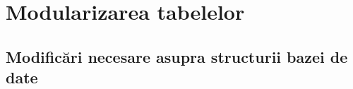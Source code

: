 \section*{Modularizarea tabelelor}
	\subsection{Modificări necesare asupra structurii bazei de date}
